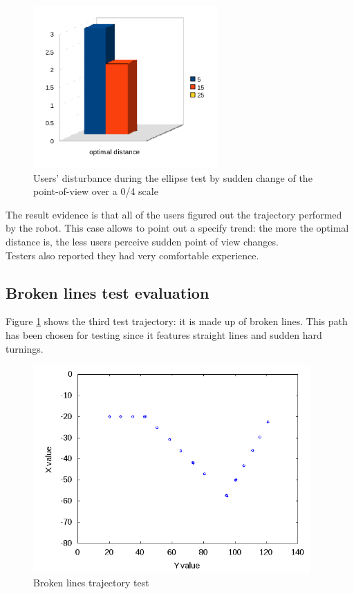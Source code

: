 \begin{figure}[!h]
  \begin{center}
    \includegraphics[width=200pt]{img/ellipse.png}
    \caption{Users' disturbance during the ellipse test 
      by sudden change of the point-of-view over a 0/4 scale}
  \end{center}
\end{figure}
%
The result evidence is that all of the users figured out the
trajectory performed by the robot. This case allows to point out
a specify trend: the more the optimal distance is, the less users
perceive sudden point of view changes.
\\
Testers also reported they had very comfortable experience.


\subsection{Broken lines test evaluation}
\label{performance_evaluation:tests_result:zigzagtest}

Figure \ref{fig:zigzagtest} shows the third test trajectory:
it is made up of broken lines. This path has been chosen for testing
since it features straight lines and sudden hard turnings.

\begin{figure}[!h]
  \begin{center}
    \includegraphics[width=300pt]{img/path_session_6.png}
    \caption{Broken lines trajectory test}
    \label{fig:zigzagtest}
  \end{center}
\end{figure}


